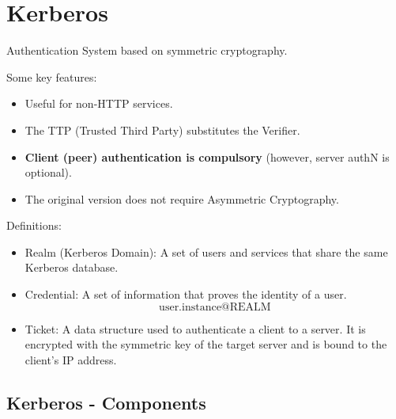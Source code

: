 \section{Kerberos}
\begin{center}
    Authentication System based on symmetric cryptography.
\end{center}



\begin{multicols}{2}
    \raggedcolumns

    \begin{center}
        Some key features:
    \end{center}
    \begin{itemize}
        \item Useful for non-HTTP services.
        \item The TTP (Trusted Third Party) substitutes the Verifier.
        \item \textbf{Client (peer) authentication is compulsory} (however, server authN is optional).
        \item The original version does not require Asymmetric Cryptography.
    \end{itemize}
\columnbreak

\begin{center}
    Definitions:
\end{center}
\begin{itemize}
    \item Realm (Kerberos Domain): A set of users and services that share the same Kerberos database.
    \item Credential: A set of information that proves the identity of a user.
    \[
        \text{user.instance@REALM}
    \]
    \item Ticket: A data structure used to authenticate a client to a server. It is encrypted with the symmetric key of the target server and is bound to the client's IP address.

\end{itemize}
\end{multicols}

\subsection*{Kerberos - Components}





